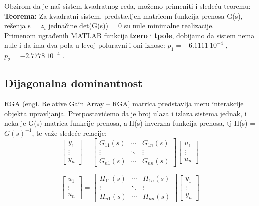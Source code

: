 \documentclass[a4paper,11pt]{article}
\theoremstyle{definition} \newtheorem{deff}{Definicija}[section]
\theoremstyle{definition} \newtheorem{prim}[deff]{Primer}
\theoremstyle{plain} \newtheorem{teor}[deff]{Teorema}
\begin{document}
	Obzirom da je naš sistem kvadratnog reda, možemo primeniti i sledeću teoremu: \\
	
	\textbf{Teorema:} Za kvadratni sistem, predstavljen matricom funkcija prenosa G(s), rešenja s = $z_i$ jednačine det(G(s)) = 0 su nule minimalne realizacije. \\
	
	Primenom ugrađenih MATLAB funkcija \textbf{tzero} i \textbf{tpole}, dobijamo da sistem nema nule i da ima dva pola u levoj poluravni i oni iznose: $p_1 = -6.1111~10^{-4}$ , $p_2 = -2.7778~10^{-4}$ .
	
	\newpage
	
	\subsection{Dijagonalna dominantnost}
	
	RGA (engl. Relative Gain Array – RGA) matrica predstavlja meru interakcije objekta upravljanja. Pretpostavićemo da je broj ulaza i izlaza sistema jednak, i neka je G(s) matrica funkcije prenosa, a H(s) inverzna funkcija prenosa, tj H(s) = $G(s)^{-1}$, te važe sledeće relacije: 
	\begin{equation}
		\begin{bmatrix}
			y_1 \\
			\vdots \\
			y_n
		\end{bmatrix}
		= 
		\begin{bmatrix}
			G_{11}(s) & \cdots & G_{1n}(s) \\
			\vdots & \ddots & \vdots \\
			G_{n1}(s) & \cdots & G_{nn}(s)
		\end{bmatrix}
		\begin{bmatrix}
			u_1 \\
			\vdots \\
			u_n
		\end{bmatrix}
		\label{eq:matricaG}
	\end{equation}
	
	\begin{equation}
		\begin{bmatrix}
			u_1 \\
			\vdots \\
			u_n
		\end{bmatrix}
		= 
		\begin{bmatrix}
			H_{11}(s) & \cdots & H_{1n}(s) \\
			\vdots & \ddots & \vdots \\
			H_{n1}(s) & \cdots & H_{nn}(s)
		\end{bmatrix}
		\begin{bmatrix}
			y_1 \\
			\vdots \\
			y_n
		\end{bmatrix}
		\label{eq:matricaH}
	\end{equation}
	
\end{document}
